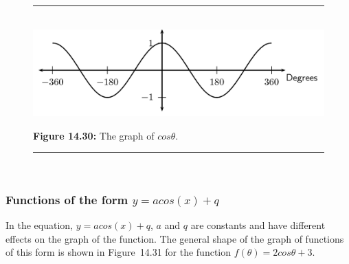     \setcounter{subfigure}{0}


	\begin{figure}[H] %
    \begin{center}
    \rule[.1in]{\figurerulewidth}{.005in} \\
        \label{m39414*uid50!!!underscore!!!media}\label{m39414*uid50!!!underscore!!!printimage}\includegraphics{col11306.imgs/m39414_MG10C15_024.png} %
        
      \vspace{2pt}
    \vspace{\rubberspace}\par \begin{cnxcaption}
	  \small \textbf{Figure 14.30: }The graph of \begin{math}cos\theta \end{math}.
	\end{cnxcaption}
      
    \vspace{.1in}
    \rule[.1in]{\figurerulewidth}{.005in} \\
        
    \end{center}

 \end{figure}   

    \addtocounter{footnote}{-0}
    
      
      \label{m39414*uid51}
            \subsubsection{ Functions of the form $y=acos\left(x\right)+q$}
            \nopagebreak
            
        
        \label{m39414*id87386}In the equation, \begin{math}y=acos\left(x\right)+q\end{math}, \begin{math}a\end{math} and \begin{math}q\end{math} are constants and have different effects on the graph of the function. The general shape of the graph of functions of this form is shown in Figure~14.31 for the function \begin{math}f\left(\theta \right)=2cos\theta +3\end{math}.\par 
        
